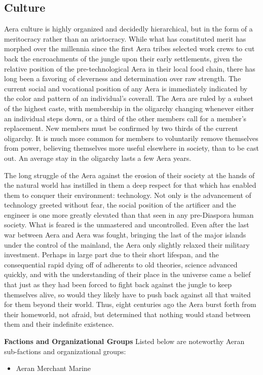 \subsection{Culture}
Aera culture is highly organized and decidedly hierarchical, but in
the form of a meritocracy rather than an aristocracy. While what has
constituted merit has morphed over the millennia since the first Aera
tribes selected work crews to cut back the encroachments of the jungle
upon their early settlements, given the relative position of the
pre-technological Aera in their local food chain, there has long been
a favoring of cleverness and determination over raw strength. The
current social and vocational position of any Aera is immediately
indicated by the color and pattern of an individual's coverall. The
Aera are ruled by a subset of the highest caste, with membership in
the oligarchy changing whenever either an individual steps down, or a
third of the other members call for a member's replacement. New
members must be confirmed by two thirds of the current oligarchy. It
is much more common for members to voluntarily remove themselves from
power, believing themselves more useful elsewhere in society, than to
be cast out. An average stay in the oligarchy lasts a few Aera years.

The long struggle of the Aera against the erosion of their society at
the hands of the natural world has instilled in them a deep respect
for that which has enabled them to conquer their environment:
technology. Not only is the advancement of technology greeted without
fear, the social position of the artificer and the engineer is one
more greatly elevated than that seen in any pre-Diaspora human
society. What is feared is the unmastered and uncontrolled. Even after
the last war between Aera and Aera was fought, bringing the last of
the major islands under the control of the mainland, the Aera only
slightly relaxed their military investment. Perhaps in large part due
to their short lifespan, and the consequential rapid dying off of
adherents to old theories, science advanced quickly, and with the
understanding of their place in the universe came a belief that just
as they had been forced to fight back against the jungle to keep
themselves alive, so would they likely have to push back against all
that waited for them beyond their world. Thus, eight centuries ago the
Aera burst forth from their homeworld, not afraid, but determined that
nothing would stand between them and their indefinite existence.

{\bf Factions and Organizational Groups}
Listed below are noteworthy Aeran sub-factions and organizational groups: 
\begin{itemize}
\item Aeran Merchant Marine
\end{itemize}

